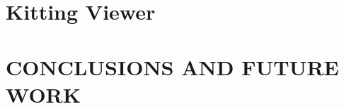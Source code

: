 \section{Kitting Viewer}
\label{sect:KittingViewer}



\addtolength{\textheight}{-4cm}


\section{CONCLUSIONS AND FUTURE WORK}
\label{sect:Conclusions}






